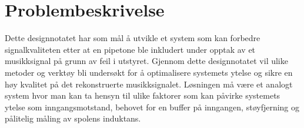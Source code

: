 \section{Problembeskrivelse}
\label{problemBeskrivelse}



Dette designnotatet har som mål å utvikle et system som kan forbedre signalkvaliteten etter at en pipetone ble inkludert under opptak av et musikksignal på grunn av feil i utstyret\cite{Problemstillingen}. Gjennom dette designnotatet vil ulike metoder og verktøy bli undersøkt for å optimalisere systemets ytelse og sikre en høy kvalitet på det rekonstruerte musikksignalet. Løsningen må være et analogt system hvor man kan ta hensyn til ulike faktorer som kan påvirke systemets ytelse som inngangsmotstand, behovet for en buffer på inngangen, støyfjerning og pålitelig måling av spolens induktans.
